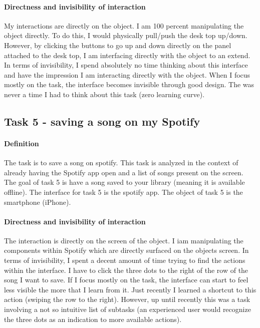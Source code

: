 \paragraph{Directness and invisibility of interaction}
My interactions are directly on the object. I am 100 percent manipulating the object directly. To do this, I would physically pull/push the desk top up/down. However, by clicking the buttons to go up and down directly on the panel attached to the desk top, I am interfacing directly with the object to an extend. In terms of invisibility, I spend absolutely no time thinking about this interface and have the impression I am interacting directly with the object. When I focus mostly on the task, the interface becomes invisible through good design. The was never a time I had to think about this task (zero learning curve).

\subsection{Task 5 - saving a song on my Spotify}

\paragraph{Definition}
The task is to save a song on spotify. This task is analyzed in the context of already having the Spotify app open and a list of songs present on the screen. The goal of task 5 is have a song saved to your library (meaning it is available offline). The interface for task 5 is the spotify app. The object of task 5 is the smartphone (iPhone).

\paragraph{Directness and invisibility of interaction}
The interaction is directly on the screen of the object. I iam manipulating the components within Spotify which are directly surfaced on the objects screen. In terms of invisibility, I spent a decent amount of time trying to find the actions within the interface. I have to click the three dots to the right of the row of the song I want to save. If I focus mostly on the task, the interface can start to feel less visible the more that I learn from it. Just recently I learned a shortcut to this action (swiping the row to the right). However, up until recently this was a task involving a not so intuitive list of subtasks (an experienced user would recognize the three dots as an indication to more available actions).

